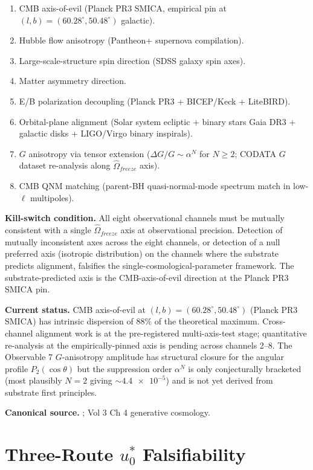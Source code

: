 \begin{enumerate}
    \item CMB axis-of-evil (Planck PR3 SMICA, empirical pin at $(l, b) = (60.28^\circ, 50.48^\circ)$ galactic).
    \item Hubble flow anisotropy (Pantheon+ supernova compilation).
    \item Large-scale-structure spin direction (SDSS galaxy spin axes).
    \item Matter asymmetry direction.
    \item E/B polarization decoupling (Planck PR3 + BICEP/Keck + LiteBIRD).
    \item Orbital-plane alignment (Solar system ecliptic + binary stars Gaia DR3 + galactic disks + LIGO/Virgo binary inspirals).
    \item $G$ anisotropy via tensor extension ($\Delta G/G \sim \alpha^N$ for $N \geq 2$; CODATA $G$ dataset re-analysis along $\hat{\Omega}_{freeze}$ axis).
    \item CMB QNM matching (parent-BH quasi-normal-mode spectrum match in low-$\ell$ multipoles).
\end{enumerate}

\textbf{Kill-switch condition.} All eight observational channels must be mutually consistent with a single $\hat{\Omega}_{freeze}$ axis at observational precision. Detection of mutually inconsistent axes across the eight channels, or detection of a null preferred axis (isotropic distribution) on the channels where the substrate predicts alignment, falsifies the single-cosmological-parameter framework. The substrate-predicted axis is the CMB-axis-of-evil direction at the Planck PR3 SMICA pin.

\textbf{Current status.} CMB axis-of-evil at $(l, b) = (60.28^\circ, 50.48^\circ)$ (Planck PR3 SMICA) has intrinsic dispersion of $88\%$ of the theoretical maximum. Cross-channel alignment work is at the pre-registered multi-axis-test stage; quantitative re-analysis at the empirically-pinned axis is pending across channels 2--8. The Observable 7 $G$-anisotropy amplitude has structural closure for the angular profile $P_2(\cos\theta)$ but the suppression order $\alpha^N$ is only conjecturally bracketed (most plausibly $N = 2$ giving $\sim \num{4.4e-5}$) and is not yet derived from substrate first principles.

\textbf{Canonical source.} ; Vol 3 Ch 4 generative cosmology.

\section{Three-Route $u_0^*$ Falsifiability}
\label{sec:vol9_three_route_falsifiability}

